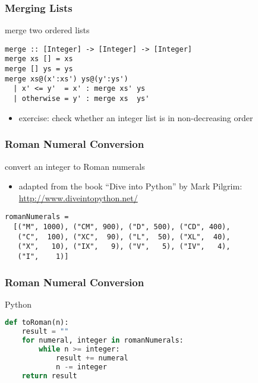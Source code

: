 \documentclass[dvipsnames]{beamer}
\theoremstyle{plain}
\begin{document}
\begin{frame}[fragile]
  \frametitle{Merging Lists}

  \begin{exampleblock}{merge two ordered lists}
    \begin{lstlisting}
merge :: [Integer] -> [Integer] -> [Integer]
merge xs [] = xs
merge [] ys = ys
merge xs@(x':xs') ys@(y':ys')
  | x' <= y'  = x' : merge xs' ys
  | otherwise = y' : merge xs  ys'
    \end{lstlisting}
  \end{exampleblock}

  \pause
  \begin{itemize}
    \item exercise: check whether an integer list is in non-decreasing order
  \end{itemize}
\end{frame}

\begin{frame}[fragile]
  \frametitle{Roman Numeral Conversion}

  \begin{exampleblock}{convert an integer to Roman numerals}
    \begin{itemize}
      \item adapted from the book ``Dive into Python'' by Mark Pilgrim:\\
        \url{http://www.diveintopython.net/}
    \end{itemize}

    \medskip
    \begin{lstlisting}
romanNumerals =
  [("M", 1000), ("CM", 900), ("D", 500), ("CD", 400),
   ("C",  100), ("XC",  90), ("L",  50), ("XL",  40),
   ("X",   10), ("IX",   9), ("V",   5), ("IV",   4),
   ("I",    1)]
    \end{lstlisting}
  \end{exampleblock}
\end{frame}

\begin{frame}[fragile]
  \frametitle{Roman Numeral Conversion}

  \begin{exampleblock}{Python}
    \begin{lstlisting}[language=Python]
def toRoman(n):
    result = ""
    for numeral, integer in romanNumerals:
        while n >= integer:
            result += numeral
            n -= integer
    return result
    \end{lstlisting}
  \end{exampleblock}
\end{frame}
\end{document}
